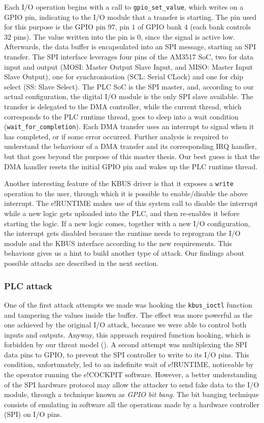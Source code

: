 Each I/O operation begins with a call to \verb|gpio_set_value|, which writes on a GPIO pin, indicating to the I/O module that a transfer is starting.
The pin used for this purpose is the GPIO pin $97$, \ie pin $1$ of GPIO bank $4$ (each bank controls $32$ pins). The value written into the pin is $0$,
since the signal is active low. Afterwards, the data buffer is encapsulated into an SPI message, starting an SPI transfer.
The SPI interface leverages four pins of the AM3517 SoC, two for data input and output (MOSI: Master Output Slave Input, and MISO: Master Input Slave Output),
one for synchronisation (SCL: Serial CLock) and one for chip select (SS: Slave Select).
The PLC SoC is the SPI master, and, according to our actual configuration, the digital I/O module is the only SPI slave available.
The transfer is delegated to the DMA controller, while the current thread, which corresponds to the PLC runtime thread,
goes to sleep into a wait condition (\verb|wait_for_completion|). Each DMA transfer uses an interrupt to signal when it has completed, or if some error occurred.
Further analysis is required to understand the behaviour of a DMA transfer and its corresponding IRQ handler, but that goes beyond the purpose of this master thesis.
Our best guess is that the DMA handler resets the initial GPIO pin and wakes up the PLC runtime thread.

Another interesting feature of the KBUS driver is that it exposes a \verb|write| operation to the user, through which it is possible to enable/disable the above interrupt.
The e!RUNTIME makes use of this system call to disable the interrupt while a new logic gets uploaded into the PLC, and then re-enables it before starting the logic.
If a new logic comes, together with a new I/O configuration, the interrupt gets disabled because the runtime needs to reprogram the I/O module
and the KBUS interface according to the new requirements. This behaviour gives us a hint to build another type of attack.
Our findings about possible attacks are described in the next section.


\subsubsection{PLC attack}

One of the first attack attempts we made was hooking the \verb|kbus_ioctl| function and tampering the values
inside the buffer. The effect was more powerful as the one achieved by the original I/O attack, because we were able to control both inputs and outputs.
Anyway, this approach required function hooking, which is forbidden by our threat model ().
A second attempt was multiplexing the SPI data pins to GPIO, to prevent the SPI controller to write to its I/O pins.
This condition, unfortunately, led to an indefinite wait of e!RUNTIME, noticeable by the operator running the e!COCKPIT software.
However, a better understanding of the SPI hardware protocol may allow the attacker to send fake data to the I/O module,
through a technique known as \emph{GPIO bit bang}. The bit banging technique consists of emulating in software all the operations made by
a hardware controller (\eg SPI) on I/O pins.

